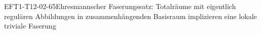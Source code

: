 
\begin{PROP}{EFT1-T12-02-65}{Ehresmannscher Faserungssatz: Totalräume mit eigentlich regulären Abbildungen in zusammenhängenden Basisraum implizieren eine lokale triviale Faserung}
\end{PROP}
